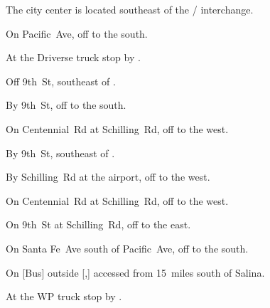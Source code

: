 
The city center is located southeast of the  /  interchange.

\begin{LocationList}

On Pacific~Ave, off   to the south.

At the Driverse truck stop by  .

Off 9th~St, southeast of  .

By 9th~St, off   to the south.

On Centennial~Rd at Schilling~Rd, off   to the west.

\Location{\GarageHQ \Garage}
By 9th~St, southeast of  .

By Schilling~Rd at the airport, off   to the west.

\Location{\RecruitmentAgency \Recruitment}
On Centennial~Rd at Schilling~Rd, off   to the west.

On 9th~St at Schilling~Rd, off   to the east.

On Santa Fe~Ave south of Pacific~Ave, off   to the south.

On [Bus] outside [,] accessed from  15~miles south of Salina.

At the WP truck stop by  .

\end{LocationList}
